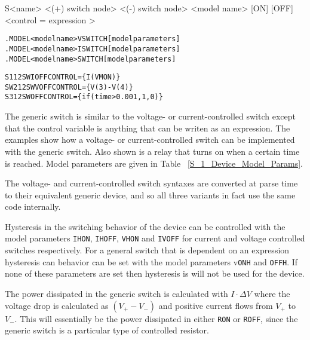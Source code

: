 


\begin{Device}

\device
S<name> <(+) switch node> <(-) switch node> <model name> [ON] [OFF] <control = { expression }>

\model
\begin{alltt}
.MODEL <model name> VSWITCH [model parameters]
.MODEL <model name> ISWITCH [model parameters]
.MODEL <model name> SWITCH [model parameters]
\end{alltt}

\examples
\begin{alltt}
S1 1 2 SWI OFF CONTROL=\{I(VMON)\}
SW2 1 2 SWV OFF CONTROL=\{V(3)-V(4)\}
S3 1 2 SW OFF CONTROL=\{if(time>0.001,1,0)\}
\end{alltt}

\comments

The generic switch is similar to the voltage- or current-controlled
switch except that the control variable is anything that can be writen
as an expression.  The examples show how a voltage- or
current-controlled switch can be implemented with the generic switch.
Also shown is a relay that turns on when a certain time is reached.
Model parameters are given in Table ~\ref{S_1_Device_Model_Params}.

The voltage- and current-controlled switch syntaxes are converted at
parse time to their equivalent generic device, and so all three
variants in fact use the same code internally.

Hysteresis in the switching behavior of the device can be controlled with 
the model parameters \texttt{IHON}, \texttt{IHOFF}, \texttt{VHON} and
\texttt{IVOFF} for current and voltage controlled switches respectively.  
For a general switch that is dependent on an expression hysteresis can 
behavior can be set with the model parameters v\texttt{ONH} and \texttt{OFFH}. 
If none of these parameters are set then hysteresis is will not be used 
for the device. 

The power dissipated in the generic switch is calculated with $I \cdot \Delta V$ 
where the voltage drop is calculated as $(V_+ - V_-)$ and positive current 
flows from $V_+$ to $V_-$.  This will essentially be the power dissipated
in either \texttt{RON} or \texttt{ROFF}, since the generic switch is a particular 
type of controlled resistor.

\end{Device}
